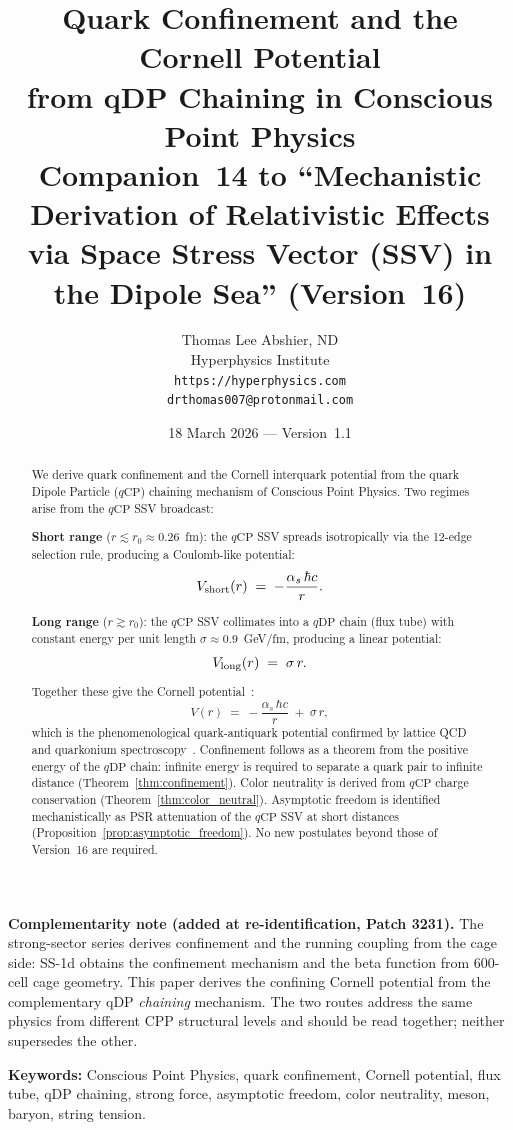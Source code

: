 \documentclass[12pt]{article}
\title{\textbf{Quark Confinement and the Cornell Potential\\
from qDP Chaining in Conscious Point Physics}\\[6pt]
{\large Companion~14 to ``Mechanistic Derivation of Relativistic Effects\\
via Space Stress Vector (SSV) in the Dipole Sea'' (Version~16)}}
\author{Thomas Lee Abshier, ND\\
Hyperphysics Institute\\
\texttt{https://hyperphysics.com}\\
\texttt{drthomas007@protonmail.com}}
\date{18 March 2026 --- Version~1.1}
\newcommand{\qCP}{q\mathrm{CP}}
\newcommand{\qDP}{q\mathrm{DP}}
\newcommand{\as}{\alpha_s}
\begin{document}
\maketitle

\noindent\textbf{Complementarity note (added at re-identification,
Patch 3231).} The strong-sector series derives confinement and the
running coupling from the cage side: SS-1d obtains the confinement
mechanism and the beta function from 600-cell cage geometry. This paper
derives the confining Cornell potential from the complementary qDP
\emph{chaining} mechanism. The two routes address the same physics from
different CPP structural levels and should be read together; neither
supersedes the other.


\noindent\textbf{Keywords:} Conscious Point Physics, quark confinement,
Cornell potential, flux tube, qDP chaining, strong force, asymptotic
freedom, color neutrality, meson, baryon, string tension.


\begin{abstract}
We derive quark confinement and the Cornell interquark potential from
the quark Dipole Particle ($\qCP$) chaining mechanism of Conscious
Point Physics. Two regimes arise from the $\qCP$ SSV broadcast:

\noindent\textbf{Short range} ($r \lesssim r_0 \approx 0.26$~fm):
the $\qCP$ SSV spreads isotropically via the 12-edge selection rule,
producing a Coulomb-like potential:
\begin{equation}
V_{\rm short}(r) \;=\; -\frac{\as\,\hbar c}{r}.
\label{eq:V_short_abstract}
\end{equation}

\noindent\textbf{Long range} ($r \gtrsim r_0$):
the $\qCP$ SSV collimates into a $\qDP$ chain (flux tube) with
constant energy per unit length $\sigma \approx 0.9$~GeV/fm,
producing a linear potential:
\begin{equation}
V_{\rm long}(r) \;=\; \sigma\,r.
\label{eq:V_long_abstract}
\end{equation}

Together these give the Cornell potential~\cite{cornell1978}:
\begin{equation}
V(r) \;=\; -\frac{\as\,\hbar c}{r} \;+\; \sigma\,r,
\label{eq:cornell_abstract}
\end{equation}
which is the phenomenological quark-antiquark potential confirmed by
lattice QCD and quarkonium spectroscopy~\cite{eichten1980}.
Confinement follows as a theorem from the positive energy of the
$\qDP$ chain: infinite energy is required to separate a quark pair
to infinite distance (Theorem~\ref{thm:confinement}). Color
neutrality is derived from $\qCP$ charge conservation
(Theorem~\ref{thm:color_neutral}). Asymptotic freedom is
identified mechanistically as PSR attenuation of the $\qCP$ SSV
at short distances (Proposition~\ref{prop:asymptotic_freedom}).
No new postulates beyond those of Version~16 are required.
\end{abstract}
\end{document}
